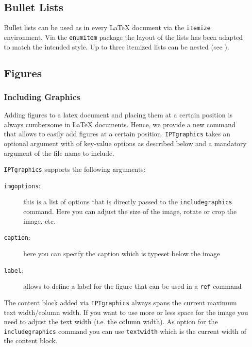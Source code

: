 
\subsection{Bullet Lists}

Bullet lists can be used as in every \LaTeX{} document via the \texttt{itemize} environment. Via the \texttt{enumitem} package the layout of the lists has been adapted to match the intended style. Up to three itemized lists can be nested (see ).



\subsection{Figures}

\subsubsection{Including Graphics}

Adding figures to a latex document and placing them at a certain position is always cumbersome in \LaTeX{} documents. Hence, we provide a new command \texttt{} that allows to easily add figures at a certain position. 
\texttt{IPTgraphics} takes an optional argument with of key-value options as described below and a mandatory argument of the file name to include.

\texttt{IPTgraphics} supports the following arguments:
\begin{description}
	\item[\texttt{imgoptions}:] this is a list of options that is directly passed to the \texttt{\bs{}includegraphics} command. Here you can adjust the size of the image, rotate or crop the image, etc.
	\item[\texttt{caption}:] here you can specify the caption which is typeset below the image
	\item[\texttt{label}:] allows to define a label for the figure that can be used in a \texttt{\bs{}ref} command
\end{description}

The content block added via \texttt{IPTgraphics} always spans the current maximum text width/column width. If you want to use more or less space for the image you need to adjust the text width (i.e. the column width). As option for the \texttt{includegraphics} command you can use \texttt{\bs{}textwidth} which is the current width of the content block.

